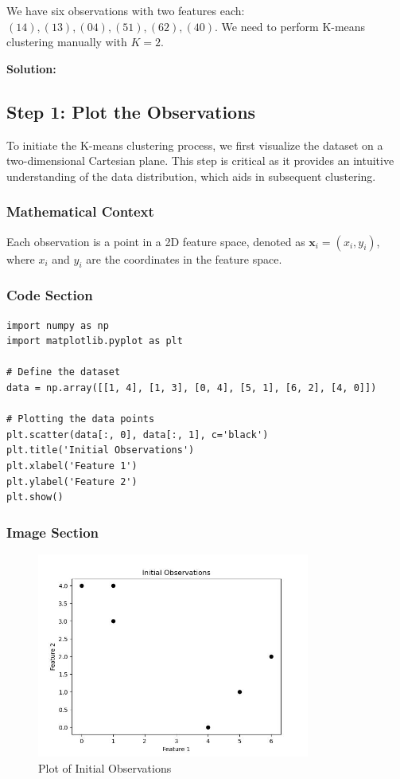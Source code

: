 \documentclass{exam}
\begin{document}
We have six observations with two features each: \( (14), (13), (04), (51), (62), (40) \). We need to perform K-means clustering manually with \( K = 2 \).

\textbf{Solution:}

\subsection{Step 1: Plot the Observations}

To initiate the K-means clustering process, we first visualize the dataset on a two-dimensional Cartesian plane. This step is critical as it provides an intuitive understanding of the data distribution, which aids in subsequent clustering.

\subsubsection*{Mathematical Context}
Each observation is a point in a 2D feature space, denoted as \( \mathbf{x}_i = (x_i, y_i) \), where \( x_i \) and \( y_i \) are the coordinates in the feature space.

\subsubsection*{Code Section}

\begin{verbatim}
import numpy as np
import matplotlib.pyplot as plt

# Define the dataset
data = np.array([[1, 4], [1, 3], [0, 4], [5, 1], [6, 2], [4, 0]])

# Plotting the data points
plt.scatter(data[:, 0], data[:, 1], c='black')
plt.title('Initial Observations')
plt.xlabel('Feature 1')
plt.ylabel('Feature 2')
plt.show()
\end{verbatim}

\subsubsection*{Image Section}

\begin{figure}[h!]
    \centering
    \includegraphics[width=0.8\textwidth]{images/initial_observations.jpg}
    \caption{Plot of Initial Observations}
    \label{fig:initial_observations}
\end{figure}
\end{document}
